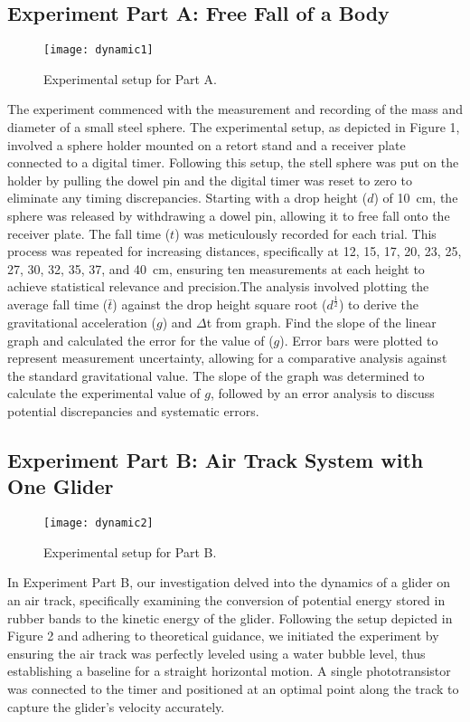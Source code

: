 \documentclass[a4paper,11pt]{article}
\begin{document}
\subsection*{Experiment Part A: Free Fall of a Body}
\begin{figure}[ht]
    \centering
    \texttt{[image: dynamic1]}
    \caption{Experimental setup for Part A.}
    \label{fig:setupA}
\end{figure}
The experiment commenced with the measurement and recording of the mass and diameter of a small steel sphere. The experimental setup, as depicted in Figure 1, involved a sphere holder mounted on a retort stand and a receiver plate connected to a digital timer.  Following this setup, the stell sphere was put on the holder by pulling the dowel pin and the digital timer was reset to zero to eliminate any timing discrepancies. Starting with a drop height ($d$) of \SI{10}{cm}, the sphere was released by withdrawing a dowel pin, allowing it to free fall onto the receiver plate. The fall time ($t$) was meticulously recorded for each trial. This process was repeated for increasing distances, specifically at 12, 15, 17, 20, 23, 25, 27, 30, 32, 35, 37, and \SI{40}{cm}, ensuring ten measurements at each height to achieve statistical relevance and precision.The analysis involved plotting the average fall time ($\bar{t}$) against the drop height square root ($d^\frac{1}{2}$) to derive the gravitational acceleration ($g$) and $\Delta$t from graph. Find the slope of the linear graph and calculated the error for the value of ($g$). Error bars were plotted to represent measurement uncertainty, allowing for a comparative analysis against the standard gravitational value. The slope of the graph was determined to calculate the experimental value of $g$, followed by an error analysis to discuss potential discrepancies and systematic errors.

\subsection*{Experiment Part B: Air Track System with One Glider}
\begin{figure}[ht]
    \centering
    \texttt{[image: dynamic2]}
    \caption{Experimental setup for Part B.}
    \label{fig:setupB}
\end{figure}
In Experiment Part B, our investigation delved into the dynamics of a glider on an air track, specifically examining the conversion of potential energy stored in rubber bands to the kinetic energy of the glider. Following the setup depicted in Figure 2 and adhering to theoretical guidance, we initiated the experiment by ensuring the air track was perfectly leveled using a water bubble level, thus establishing a baseline for a straight horizontal motion. A single phototransistor was connected to the timer and positioned at an optimal point along the track to capture the glider's velocity accurately.
\end{document}
